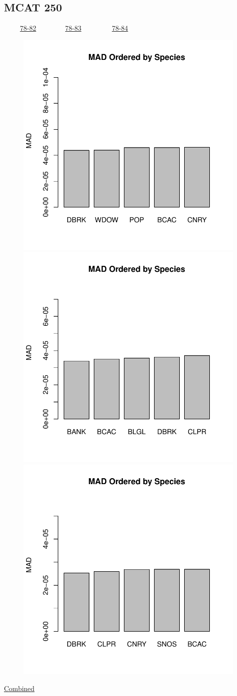 \documentclass[ xcolor = pdftex, dvipsnames, table ]{beamer}
\begin{document}
\subsection{MCAT 250}
\begin{frame}{$~~~~~~~~~$ \href{https://github.com/gasduster99/sppComp/tree/master/sscRuns/25019781982M4}{78-82} $~~~~~~~~~~~~~~~~$ \href{https://github.com/gasduster99/sppComp/tree/master/sscRuns/25019781983M4}{78-83} $~~~~~~~~~~~~~~~~~$ \href{https://github.com/gasduster99/sppComp/tree/master/sscRuns/25019781984M4}{78-84} }	
	\begin{figure}[ht!]
        \centering
	\hspace*{-1cm}
        \includegraphics[width=.4\textwidth]{../sscRuns/25019781982M4/sppHeadMad68.pdf}
        \includegraphics[width=.4\textwidth]{../sscRuns/25019781983M4/sppHeadMad68.pdf}
	\includegraphics[width=.4\textwidth]{../sscRuns/25019781984M4/sppHeadMad68.pdf}
	\end{figure}
	\vspace{-1cm}
	\begin{center}
	\Large
	\href{https://github.com/gasduster99/sppComp/tree/master/try1/postSSC/25019781982345M4}{Combined}
	\end{center}
\end{frame}
\end{document}
